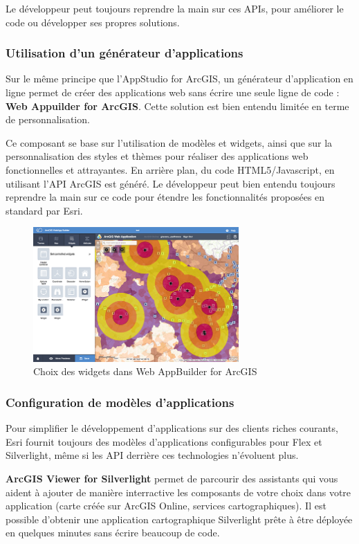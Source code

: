 \documentclass[11pt]{article}
\begin{document}
Le développeur peut toujours reprendre la main sur ces APIs, pour améliorer le code ou développer ses propres solutions.


\subsubsection{Utilisation d'un générateur d'applications}
Sur le même principe que l'AppStudio for ArcGIS, un générateur d'application en ligne permet de créer des applications web sans écrire une seule ligne de code : \textbf{Web Appuilder for ArcGIS}. Cette solution est bien entendu limitée en terme de personnalisation.

Ce composant se base sur l'utilisation de modèles et widgets, ainsi que sur la personnalisation des styles et thèmes pour réaliser des applications web fonctionnelles et attrayantes. En arrière plan, du code HTML5/Javascript, en utilisant l'API ArcGIS est généré. Le développeur peut bien entendu toujours reprendre la main sur ce code pour étendre les fonctionnalités proposées en standard par Esri.

\begin{figure}[H]
	\center \includegraphics[width=0.70\textwidth]{img/cours/web_appbuilder.png}
	\caption{Choix des widgets dans Web AppBuilder for ArcGIS}
\end{figure}


\subsubsection{Configuration de modèles d'applications}
Pour simplifier le développement d'applications sur des clients riches courants, Esri fournit toujours des modèles d'applications configurables pour Flex et Silverlight, même si les API derrière ces technologies n'évoluent plus. 

\textbf{ArcGIS Viewer for Silverlight} permet de parcourir des assistants qui vous aident à ajouter de manière interractive les composants de votre choix dans votre application (carte créée sur ArcGIS Online, services cartographiques). Il est possible d'obtenir une application cartographique Silverlight prête à être déployée en quelques minutes sans écrire beaucoup de code.
\end{document}
